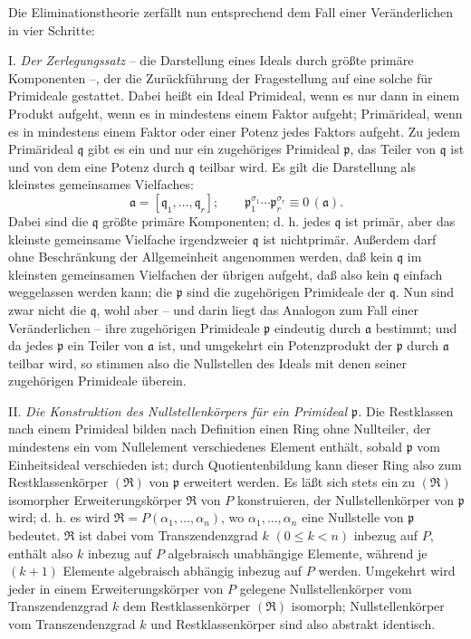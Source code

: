 Die Eliminationstheorie zerfällt nun entsprechend dem Fall einer Veränderlichen in vier Schritte:

I. \emph{Der Zerlegungssatz} -- die Darstellung eines Ideals durch größte primäre Komponenten --, der die Zurückführung der Fragestellung auf eine solche für Primideale gestattet. Dabei heißt ein Ideal Primideal, wenn es nur dann in einem Produkt aufgeht, wenn es in mindestens einem Faktor aufgeht; Primärideal, wenn es in mindestens einem Faktor oder einer Potenz jedes Faktors aufgeht. Zu jedem Primärideal $\mathfrak q$ gibt es ein und nur ein zugehöriges Primideal $\mathfrak p$, das Teiler von $\mathfrak q$ ist und von dem eine Potenz durch $\mathfrak q$ teilbar wird. Es gilt die Darstellung als kleinstes gemeinsames Vielfaches:
\[
 \mathfrak a=[\mathfrak q_1,\ldots,\mathfrak q_r];\qquad
 \mathfrak p_1^{\sigma_1}\cdots \mathfrak p_r^{\sigma_r}\equiv 0\,(\mathfrak a).
\]
Dabei sind die $\mathfrak q$ größte primäre Komponenten; d. h. jedes $\mathfrak q$ ist primär, aber das kleinste gemeinsame Vielfache irgendzweier $\mathfrak q$ ist nichtprimär. Außerdem darf ohne Beschränkung der Allgemeinheit angenommen werden, daß kein $\mathfrak q$ im kleinsten gemeinsamen Vielfachen der übrigen aufgeht, daß also kein $\mathfrak q$ einfach weggelassen werden kann; die $\mathfrak p$ sind die zugehörigen Primideale der $\mathfrak q$. Nun sind zwar nicht die $\mathfrak q$, wohl aber -- und darin liegt das Analogon zum Fall einer Veränderlichen -- ihre zugehörigen Primideale $\mathfrak p$ eindeutig durch $\mathfrak a$ bestimmt; und da jedes $\mathfrak p$ ein Teiler von $\mathfrak a$ ist, und umgekehrt ein Potenzprodukt der $\mathfrak p$ durch $\mathfrak a$ teilbar wird, so stimmen also die Nullstellen des Ideals mit denen seiner zugehörigen Primideale überein.

II. \emph{Die Konstruktion des Nullstellenkörpers für ein Primideal $\mathfrak p$.} Die Restklassen nach einem Primideal bilden nach Definition einen Ring ohne Nullteiler, der mindestens ein vom Nullelement verschiedenes Element enthält, sobald $\mathfrak p$ vom Einheitsideal verschieden ist; durch Quotientenbildung kann dieser Ring also zum Restklassenkörper $(\mathfrak R)$ von $\mathfrak p$ erweitert werden. Es läßt sich stets ein zu $(\mathfrak R)$ isomorpher Erweiterungskörper $\mathfrak R$ von $P$ konstruieren, der Nullstellenkörper von $\mathfrak p$ wird; d. h. es wird $\mathfrak R=P(\alpha_1,\ldots,\alpha_n)$, wo $\alpha_1,\ldots,\alpha_n$ eine Nullstelle von $\mathfrak p$ bedeutet. $\mathfrak R$ ist dabei vom Transzendenzgrad $k$ $(0\leq k<n)$ inbezug auf $P$, enthält also $k$ inbezug auf $P$ algebraisch unabhängige Elemente, während je $(k+1)$ Elemente algebraisch abhängig inbezug auf $P$ werden. Umgekehrt wird jeder in einem Erweiterungskörper von $P$ gelegene Nullstellenkörper vom Transzendenzgrad $k$ dem Restklassenkörper $(\mathfrak R)$ isomorph; Nullstellenkörper vom Transzendenzgrad $k$ und Restklassenkörper sind also abstrakt identisch.

